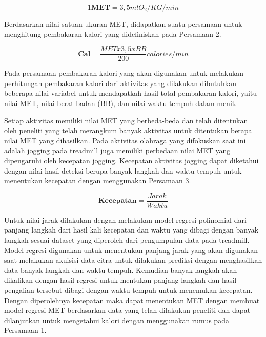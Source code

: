 \begin{equation}
  \label{eq:SatuanMET}
  1 \mathbf{MET} = 3,5 ml O_2  / KG / min
\end{equation}

Berdasarkan nilai satuan ukuran MET, didapatkan suatu persamaan untuk menghitung pembakaran kalori yang didefiniskan pada Persamaan 2.

\begin{equation}
  \label{eq:RumusKalori}
  \mathbf{Cal} = \frac{MET x 3,5 x BB}{200} calories / min
\end{equation}

Pada persamaan pembakaran kalori yang akan digunakan untuk melakukan perhitungan pembakaran kalori dari aktivitas yang dilakukan dibutuhkan beberapa nilai variabel untuk mendapatkah hasil total pembakaran kalori, yaitu nilai MET, nilai berat badan (BB), dan nilai waktu tempuh dalam menit.

Setiap aktivitas memiliki nilai MET yang berbeda-beda dan telah ditentukan oleh peneliti yang telah merangkum banyak aktivitas untuk ditentukan berapa nilai MET yang dihasilkan. Pada aktivitas olahraga yang difokuskan saat ini adalah jogging pada treadmill juga memiliki perbedaan nilai MET yang dipengaruhi oleh kecepatan jogging. Kecepatan aktivitas jogging dapat diketahui dengan nilai hasil deteksi berupa banyak langkah dan waktu tempuh untuk menentukan kecepatan dengan menggunakan Persamaan 3.

\begin{equation}
  \label{eq:RumusKecepatan}
  \mathbf{Kecepatan} = \frac{Jarak}{Waktu}
\end{equation}

Untuk nilai jarak dilakukan dengan melakukan model regresi polinomial dari panjang langkah dari hasil kali kecepatan dan waktu yang dibagi dengan banyak langkah sesuai dataset yang diperoleh dari pengumpulan data pada treadmill. Model regresi digunakan untuk menentukan panjang jarak yang akan digunakan saat melakukan akuisisi data citra untuk dilakukan prediksi dengan menghasilkan data banyak langkah dan waktu tempuh. Kemudian banyak langkah akan dikalikan dengan hasil regresi untuk mentukan panjang langkah dan hasil pengalian tersebut dibagi dengan waktu tempuh untuk menemukan kecepatan. Dengan diperolehnya kecepatan maka dapat menentukan MET dengan membuat model regresi MET berdasarkan data yang telah dilakukan peneliti dan dapat dilanjutkan untuk mengetahui kalori dengan menggunakan rumus pada Persamaan 1.
